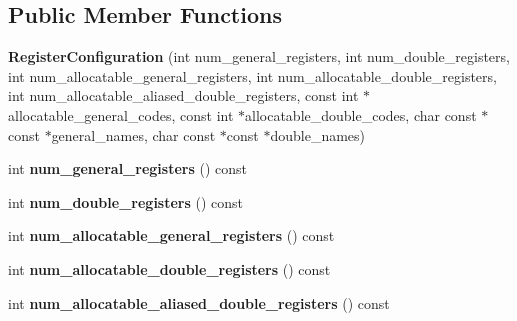 \subsection*{Public Member Functions}
\begin{DoxyCompactItemize}
\item 
{\bfseries Register\+Configuration} (int num\+\_\+general\+\_\+registers, int num\+\_\+double\+\_\+registers, int num\+\_\+allocatable\+\_\+general\+\_\+registers, int num\+\_\+allocatable\+\_\+double\+\_\+registers, int num\+\_\+allocatable\+\_\+aliased\+\_\+double\+\_\+registers, const int $\ast$allocatable\+\_\+general\+\_\+codes, const int $\ast$allocatable\+\_\+double\+\_\+codes, char const $\ast$const $\ast$general\+\_\+names, char const $\ast$const $\ast$double\+\_\+names)\hypertarget{classv8_1_1internal_1_1_register_configuration_a58ed87727f2fd0fba64deeb516e312b0}{}\label{classv8_1_1internal_1_1_register_configuration_a58ed87727f2fd0fba64deeb516e312b0}

\item 
int {\bfseries num\+\_\+general\+\_\+registers} () const \hypertarget{classv8_1_1internal_1_1_register_configuration_ac2b6084ce237de79e536a6685a1d7a6d}{}\label{classv8_1_1internal_1_1_register_configuration_ac2b6084ce237de79e536a6685a1d7a6d}

\item 
int {\bfseries num\+\_\+double\+\_\+registers} () const \hypertarget{classv8_1_1internal_1_1_register_configuration_a4031463fc98d768afbd8398f66cd9b79}{}\label{classv8_1_1internal_1_1_register_configuration_a4031463fc98d768afbd8398f66cd9b79}

\item 
int {\bfseries num\+\_\+allocatable\+\_\+general\+\_\+registers} () const \hypertarget{classv8_1_1internal_1_1_register_configuration_a24d15e318257d2e96f33a02bb66519ba}{}\label{classv8_1_1internal_1_1_register_configuration_a24d15e318257d2e96f33a02bb66519ba}

\item 
int {\bfseries num\+\_\+allocatable\+\_\+double\+\_\+registers} () const \hypertarget{classv8_1_1internal_1_1_register_configuration_afe91ba60efd7b64486ea3a9c60c068ca}{}\label{classv8_1_1internal_1_1_register_configuration_afe91ba60efd7b64486ea3a9c60c068ca}

\item 
int {\bfseries num\+\_\+allocatable\+\_\+aliased\+\_\+double\+\_\+registers} () const \hypertarget{classv8_1_1internal_1_1_register_configuration_af3d456812b38ba0fe326f738e5249e89}{}\label{classv8_1_1internal_1_1_register_configuration_af3d456812b38ba0fe326f738e5249e89}


\end{DoxyCompactItemize}
